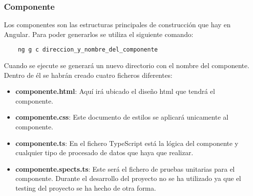 \subsubsection{Componente}
Los componentes son las estructuras principales de construcción que hay en Angular. Para poder generarlos se utiliza el siguiente comando:
\begin{verbatim}
    ng g c direccion_y_nombre_del_componente
\end{verbatim}
Cuando se ejecute se generará un nuevo directorio con el nombre del componente. Dentro de él se habrán creado cuatro ficheros diferentes:
\begin{itemize}
    \item \textbf{componente.html}: Aquí irá ubicado el diseño html que tendrá el componente.
    \item \textbf{componente.css}: Este documento de estilos se aplicará unicamente al componente.
    \item \textbf{componente.ts}: En el fichero TypeScript está la lógica del componente y cualquier tipo de procesado de datos que haya que realizar.
    \item \textbf{componente.spects.ts}: Este será el fichero de pruebas unitarias para el componente. Durante el desarrollo del proyecto no se ha utilizado ya que el testing del proyecto se ha hecho de otra forma.
\end{itemize}
